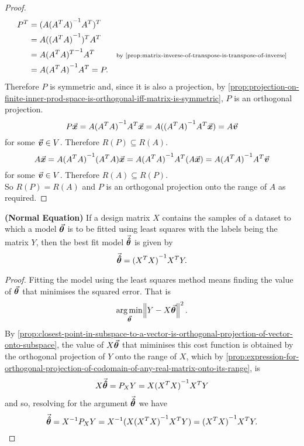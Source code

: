 \documentclass[../MathsNotesBase.tex]{subfiles}
\begin{document}
{\begin{proof}
		\[\begin{aligned}
			P^T &= (A \inv{(A^T A)} A^T)^T \\
			&= A (\inv{(A^T A)})^T A^T &\sidecomment{} \\
			&= A \inv{(A^T A)^T} A^T &\sidecomment{by \autoref{prop:matrix-inverse-of-transpose-is-transpose-of-inverse}} \\
			&= A \inv{(A^T A)} A^T = P.
		\end{aligned}\]
		Therefore $P$ is symmetric and, since it is also a projection, by \autoref{prop:projection-on-finite-inner-prod-space-is-orthogonal-iff-matrix-is-symmetric}, $P$ is an orthogonal projection.\\
		
		\[ P\vec{\bm{x}} =  A {(A^T A)}^{-1} A^T \vec{\bm{x}} = A ({(A^T A)}^{-1} A^T \vec{\bm{x}}) = A\vec{\bm{v}} \]
		for some ${ \vec{\bm{v}} \in V }$. Therefore ${ R(P) \subseteq R(A) }$.\\
		
		\[ A\vec{\bm{x}} = A {(A^T A)}^{-1} (A^T A) \vec{\bm{x}} = A {(A^T A)}^{-1} A^T (A\vec{\bm{x}}) = A {(A^T A)}^{-1} A^T \vec{\bm{v}} \]
		for some ${ \vec{\bm{v}} \in V }$. Therefore ${ R(A) \subseteq R(P) }$.\\
		
		So ${ R(P) = R(A) }$ and $P$ is an orthogonal projection onto the range of $A$ as required.
	\end{proof}

	\bigskip
	\begin{corollary}\label{coro:normal-equation}
		\textbf{(Normal Equation)} If a design matrix $X$ contains the samples of a dataset to which a model $\vec{\bm{\theta}}$ is to be fitted using least squares with the labels being the matrix $Y$, then the best fit model ${ \vec{\bm{\hat\theta}} }$ is given by
			\[ \vec{\bm{\hat\theta}} = {(X^T X)}^{-1} X^T Y. \]
	\end{corollary}
	\begin{proof}
		Fitting the model using the least squares method means finding the value of $\vec{\bm{\theta}}$ that minimises the squared error. That is
		\[ \operatorname*{arg\,min}_{\vec{\bm{\theta}}} \norm{Y - X\vec{\bm{\theta}}}^2. \]
		By \autoref{prop:closest-point-in-subspace-to-a-vector-is-orthogonal-projection-of-vector-onto-subspace}, the value of $X\vec{\bm{\theta}}$ that miminises this cost function is obtained by the orthogonal projection of $Y$ onto the range of $X$, which by \autoref{prop:expression-for-orthogonal-projection-of-codomain-of-any-real-matrix-onto-its-range}, is 
		\[ X\vec{\bm{\hat\theta}} = P_X Y = X {(X^T X)}^{-1} X^T Y \]
		and so, resolving for the argument $\vec{\bm{\hat\theta}}$ we have
		\[ \vec{\bm{\hat\theta}} = {X}^{-1} P_X Y = {X}^{-1} (X {(X^T X)}^{-1} X^T Y) = {(X^T X)}^{-1} X^T Y.   \qedhere \]
	\end{proof}


}
\end{document}
